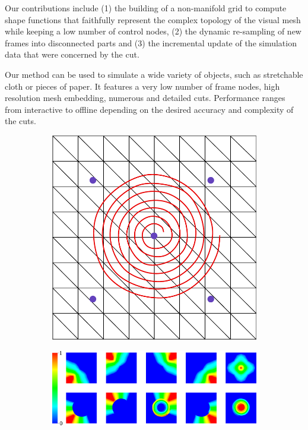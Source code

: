 \documentclass[11pt, oneside, a4paper]{memoir}
\begin{document}
Our contributions include (1) the building of a non-manifold grid to compute shape functions that faithfully represent the  complex topology of the visual mesh while keeping a low number of control nodes, (2) the dynamic re-sampling of new frames into disconnected parts and (3) the incremental update of the simulation data that were concerned by the cut.

Our method can be used to simulate a wide variety of objects, such as stretchable cloth or pieces of paper. It features a very low number of frame nodes, high resolution mesh embedding, numerous and detailed cuts. Performance ranges from interactive to offline depending on the desired accuracy and complexity of the cuts.

\begin{figure}[!ht]
\centering
\begin{subfigure}[c]{0.20\linewidth}
\centering
\includegraphics[width=\linewidth]{images/cutting-mig2015/spiral_mesh.pdf}
\caption{\label{fig:spiralMesh}}
\end{subfigure}
\hspace{1.5cm}
\begin{subfigure}[c]{0.70\linewidth}
\centering
\includegraphics[width=\linewidth]{images/cutting-mig2015/sfRender_ff/weightShow.pdf}

\end{subfigure}
\end{figure}
\end{document}
